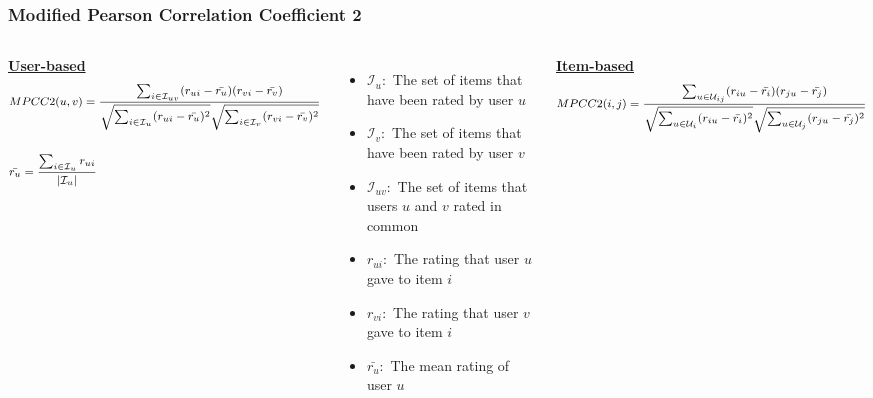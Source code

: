 \begin{frame}
    \frametitle{Modified Pearson Correlation Coefficient 2}
    \vspace{-0.8cm}
    \begin{columns}
        \hspace{-7mm}
        \centering
        \underline{\textbf{User-based}}
        \begin{equation*}
            \footnotesize
            \begin{split}
            &MPCC2(u,v) = \frac{\sum_{i \in \mathcal{I}_{uv}}(r_{ui}-\bar{r_{u}})(r_{vi}-\bar{r_{v}})}
                             {\sqrt{\sum_{i \in \mathcal{I}_{u}}(r_{ui}-\bar{r_{u}})^2}
                              \sqrt{\sum_{i \in \mathcal{I}_{v}}(r_{vi}-\bar{r_{v}})^2}} \\\\
            &\bar{r_{u}} = \frac{\sum_{i \in \mathcal{I}_u}r_{ui}}
                                {\mathopen|\mathcal{I}_u\mathclose|}
        \end{split}
        \end{equation*}
        \tiny
        \begin{itemize}
            \item $\mathcal{I}_{u}:$ The set of items that have been rated by user $u$
            \item $\mathcal{I}_{v}:$ The set of items that have been rated by user $v$
            \item $\mathcal{I}_{uv}:$ The set of items that users $u$ and $v$ rated in common
            \item $r_{ui}:$ The rating that user $u$ gave to item $i$
            \item $r_{vi}:$ The rating that user $v$ gave to item $i$
            \item $\bar{r_{u}}:$ The mean rating of user $u$
        \end{itemize}
        \centering
        \underline{\textbf{Item-based}}
        \begin{equation*}
            \footnotesize
            \begin{split}
            &MPCC2(i,j) = \frac{\sum_{u \in \mathcal{U}_{ij}}(r_{iu}-\bar{r_{i}})(r_{ju}-\bar{r_{j}})}
                             {\sqrt{\sum_{u \in \mathcal{U}_{i}}(r_{iu}-\bar{r_{i}})^2}
                              \sqrt{\sum_{u \in \mathcal{U}_{j}}(r_{ju}-\bar{r_{j}})^2}} \\\\

\end{split}
\end{equation*}
\end{columns}
\end{frame}
